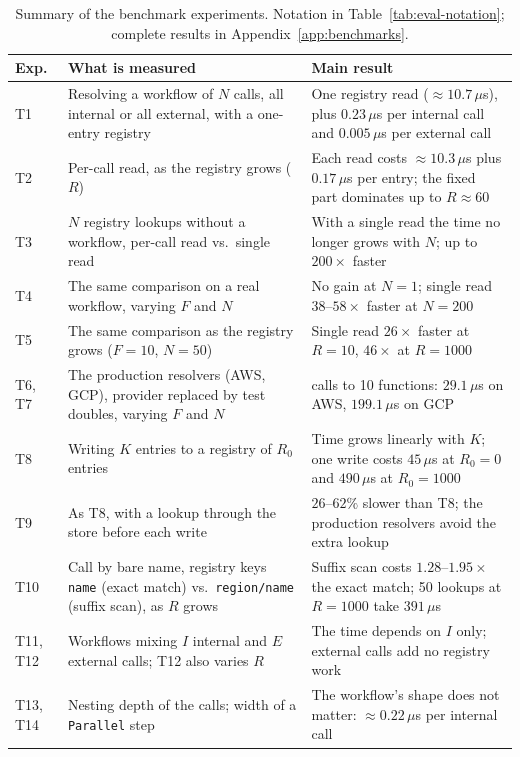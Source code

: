 \begin{table}[!htbp]
  \centering
  \captionsetup{belowskip=0pt}
  \caption{Summary of the benchmark experiments. Notation in Table~\ref{tab:eval-notation};
  complete results in Appendix~\ref{app:benchmarks}.}
  \label{tab:eval-summary}
  \small
  \begin{tabular}{|l|>{\raggedright\arraybackslash}p{}|>{\raggedright\arraybackslash}p{}|}
    \hline
    \textbf{Exp.} & \textbf{What is measured} & \textbf{Main result} \\
    \hline
    T1 & Resolving a workflow of $N$ calls, all internal or all external, with a one-entry
    registry & One registry read ($\approx 10.7\,\mu$s), plus $0.23\,\mu$s per internal call and
    $0.005\,\mu$s per external call \\
    \hline
    T2 & Per-call read, as the registry grows ($R$) & Each read costs $\approx 10.3\,\mu$s plus
    $0.17\,\mu$s per entry; the fixed part dominates up to $R \approx 60$ \\
    \hline
    T3 & $N$ registry lookups without a workflow, per-call read vs.\ single read & With a single
    read the time no longer grows with $N$; up to $200\times$ faster \\
    \hline
    T4 & The same comparison on a real workflow, varying $F$ and $N$ & No gain at $N{=}1$;
    single read $38$--$58\times$ faster at $N{=}200$ \\
    \hline
    T5 & The same comparison as the registry grows ($F{=}10$, $N{=}50$) & Single read $26\times$
    faster at $R{=}10$, $46\times$ at $R{=}1000$ \\
    \hline
    T6, T7 & The production resolvers (AWS, GCP), provider replaced by test doubles, varying $F$
    and $N$ & 200 calls to 10 functions: $29.1\,\mu$s on AWS, $199.1\,\mu$s on GCP \\
    \hline
    T8 & Writing $K$ entries to a registry of $R_0$ entries & Time grows linearly with $K$; one write
    costs $45\,\mu$s at $R_0{=}0$ and $490\,\mu$s at $R_0{=}1000$ \\
    \hline
    T9 & As T8, with a lookup through the store before each write & $26$--$62\%$ slower than T8;
    the production resolvers avoid the extra lookup \\
    \hline
    T10 & Call by bare name, registry keys \texttt{name} (exact match) vs.\ \texttt{region/name}
    (suffix scan), as $R$ grows & Suffix scan costs
    $1.28$--$1.95\times$ the exact match; 50 lookups at $R{=}1000$ take $391\,\mu$s \\
    \hline
    T11, T12 & Workflows mixing $I$ internal and $E$ external calls; T12 also varies $R$ & The
    time depends on $I$ only; external calls add no registry work \\
    \hline
    T13, T14 & Nesting depth of the calls; width of a \texttt{Parallel} step & The workflow's shape
    does not matter: $\approx 0.22\,\mu$s per internal call \\
    \hline
  \end{tabular}
\end{table}

